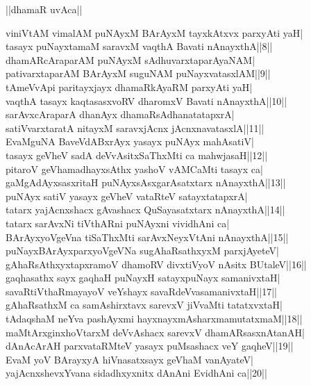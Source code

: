 \documentclass{article}
\begin{document}
\begin{center}
||dhamaR uvAca||
\end{center}

viniVtAM vimalAM puNAyxM BArAyxM tayxkAtxvx parxyAti yaH|\\
tasayx puNayxtamaM saravxM vaqthA Bavati nAnayxthA||8||\\
dhamARcAraparAM puNAyxM sAdhuvarxtaparAyaNAM|\\
pativarxtaparAM BArAyxM suguNAM puNayxvatasxlAM||9||\\
tAmeVvApi paritayxjayx dhamaRkAyaRM parxyAti yaH|\\
vaqthA tasayx kaqtasasxvoRV dharomxV Bavati nAnayxthA||10||\\
sarAvxcAraparA dhanAyx dhamaRsAdhanatatapxrA|\\
satiVvarxtaratA nitayxM saravxjAcnx jAcnxnavatasxlA||11||\\
EvaMguNA BaveVdABxrAyx yasayx puNAyx mahAsatiV|\\
tasayx geVheV sadA deVvAsitxSaThxMti ca mahwjasaH||12||\\
pitaroV geVhamadhayxsAthx yashoV vAMCaMti tasayx ca|\\
gaMgAdAyxsasxritaH puNAyxsAsxgarAsatxtarx nAnayxthA||13||\\
puNAyx satiV yasayx geVheV vataRteV satayxtatapxrA|\\
tatarx yajAcnxshacx gAvashacx QuSayasatxtarx nAnayxthA||14||\\
tatarx sarAvxNi tiVthARni puNAyxni vividhAni ca|\\
BArAyxyoVgeVna tiSaThxMti sarAvxNeyxVtAni nAnayxthA||15||\\
puNayxBArAyxparxyoVgeVNa sugAhaRsathxyxM parxjAyeteV|\\
gAhaRsAthxyxtapxramoV dhamoRV divxtiVyoV nAsitx BUtaleV||16||\\
gaqhasathx sayx gaqhaH puNayxH satayxpuNayx samanivxtaH|\\
savaRtiVthaRmayayoV veYshayx savaRdeVvasamanivxtaH||17||\\
gAhaRsathxM ca samAshirxtavx sarevxV jiVvaMti tatatxvxtaH|\\
tAdaqshaM neYva pashAyxmi hayxnayxmAsharxmamutatxmaM||18||\\
maMtArxginxhoVtarxM deVvAshacx sarevxV dhamARsasxnAtanAH|\\
dAnAcArAH parxvataRMteV yasayx puMsashacx veY gaqheV||19||\\
EvaM yoV BArayxyA hiVnasatxsayx geVhaM vanAyateV|\\
yajAcnxshevxYvana sidadhxyxnitx dAnAni EvidhAni ca||20||\\
\end{document}
